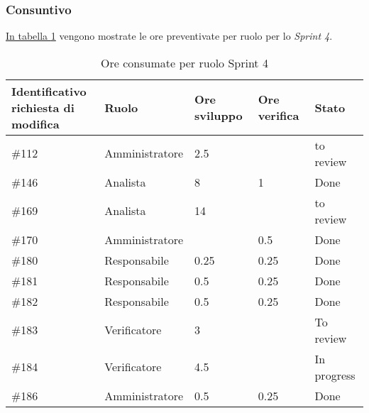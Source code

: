 \subsubsection{Consuntivo}

\hyperref[tab:sprint4_ore_consumate]{In tabella \ref{tab:sprint4_ore_consumate}} vengono mostrate le ore preventivate per ruolo per lo \textit{Sprint 4}.

\begin{table}[H]
    \centering
    \begin{tabular}{| l | l | l | l | l |}
        \hline
            \makecell{\textbf{Identificativo} \\ \textbf{richiesta di modifica}} &
            \textbf{Ruolo} & 
            \textbf{Ore sviluppo} &
            \textbf{Ore verifica} & 
            \textbf{Stato}\\ 
        \hline
            \#112 & Amministratore & 2.5 & & to review\\
        \hline
            \#146 & Analista & 8 & 1 & Done\\
        \hline
            \#169 & Analista & 14 &  & to review\\
        \hline
            \#170 & Amministratore &  & 0.5 & Done \\
        \hline
            \#180 & Responsabile & 0.25 & 0.25 & Done\\
        \hline
            \#181 & Responsabile & 0.5 & 0.25 & Done\\
        \hline
            \#182 & Responsabile & 0.5 & 0.25 & Done\\
        \hline
            \#183 & Verificatore & 3 &  & To review\\
        \hline
            \#184 & Verificatore & 4.5 &  & In progress\\
        \hline
            \#186 & Amministratore & 0.5 & 0.25 & Done\\
        \hline
    \end{tabular}
    \caption{Ore consumate per ruolo Sprint 4}
    \label{tab:sprint4_ore_consumate} 
\end{table}